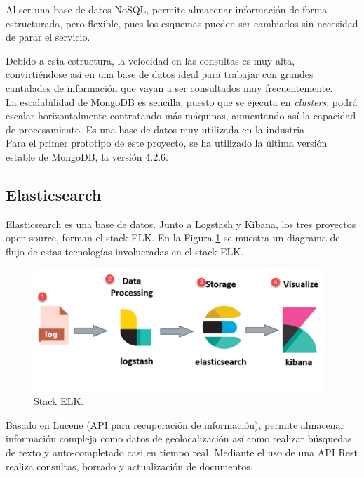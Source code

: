 \documentclass[a4paper, 12pt]{book}
\begin{document}
		Al ser una base de datos NoSQL, permite almacenar información de forma estructurada, pero flexible, pues los esquemas pueden ser cambiados sin necesidad de parar el servicio.
		
		Debido a esta estructura, la velocidad en las consultas es muy alta, convirtiéndose así en una base de datos ideal para trabajar con grandes cantidades de información que vayan a ser consultados muy frecuentemente.\\
		
		La escalabilidad de MongoDB es sencilla, puesto que se ejecuta en \textit{clusters}, podrá escalar horizontalmente contratando más máquinas, aumentando así la capacidad de procesamiento. Es una base de datos muy utilizada en la industria \cite{Use_MongoDB}.\\
		
		Para el primer prototipo de este proyecto, se ha utilizado la última versión estable de MongoDB, la versión 4.2.6.
		
	\subsection{Elasticsearch}
	\label{subsec:elasticsearch}
		Elasticsearch \cite{elasticsearch} es una base de datos. Junto a Logstash y Kibana, los tres proyectos open source, forman el stack ELK. En la Figura \ref{fig:ELK_Stack} se muestra un diagrama de flujo de estas tecnologías involucradas en el stack ELK.\\
		
		\begin{figure}[H]
			\centering
			\includegraphics[width=11cm, keepaspectratio]{img/ELK_Stack.png}
			\caption{Stack ELK.}
			\label{fig:ELK_Stack}
		\end{figure}
		
		Basado en Lucene (API para recuperación de información), permite almacenar información compleja como datos de geolocalización así como realizar búsquedas de texto y auto-completado casi en tiempo real. Mediante el uso de una API Rest realiza consultas, borrado y actualización de documentos.\\
		
\end{document}
